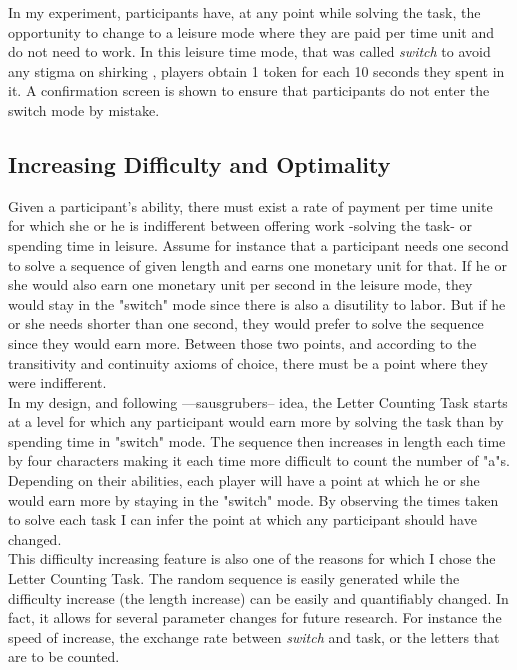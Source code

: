     In my experiment, participants have, at any point while solving the task, the opportunity to change to a leisure mode where they are paid per time unit and do not need to work. In this leisure time mode, that was called \textit{switch} to avoid any stigma on shirking \citep{rey-biel2016, eriksson2009}, players obtain 1 token for each 10 seconds they spent in it. A confirmation screen is shown to ensure that participants do not enter the switch mode by mistake.
    
    \subsection{Increasing Difficulty and Optimality}
    
    Given a participant's ability, there must exist a rate of payment per time unite for which she or he is indifferent between offering work -solving the task- or spending time in leisure. Assume for instance that a participant needs one second to solve a sequence of given length and earns one monetary unit for that. If he or she would also earn one monetary unit per second in the leisure mode, they would stay in the "switch" mode since there is also a disutility to labor. But if he or she needs shorter than one second, they would prefer to solve the sequence since they would earn more. Between those two points, and according to the transitivity and continuity axioms of choice, there must be a point where they were indifferent.\\
    
    In my design, and following ---sausgrubers-- idea, the Letter Counting Task starts at a level for which any participant would earn more by solving the task than by spending time in "switch" mode. The sequence then increases in length each time by four characters making it each time more difficult to count the number of "a"s. Depending on their abilities, each player will have a point at which he or she would earn more by staying in the "switch" mode. By observing the times taken to solve each task I can infer the point at which any participant should have changed.\\
    
    This difficulty increasing feature is also one of the reasons for which I chose the Letter Counting Task. The random sequence is easily generated while the difficulty increase (the length increase) can be easily and quantifiably changed. In fact, it allows for several parameter changes for future research. For instance the speed of increase, the exchange rate between \textit{switch} and task, or the letters that are to be counted.\\
    
